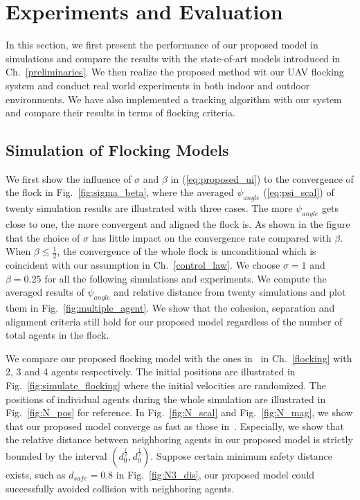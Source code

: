 \chapter{Experiments and Evaluation}\label{experiment}

In this section, we first present the performance of our proposed model in simulations and compare the results with the state-of-art models introduced in Ch.~\ref{preliminaries}. We then realize the proposed method wit our UAV flocking system and conduct real world experiments in both indoor and outdoor environments. We have also implemented a tracking algorithm with our system and compare their results in terms of flocking criteria.

\section{Simulation of Flocking Models}

We first show the influence of $\sigma$ and $\beta$ in (\ref{eq:proposed_ui}) to the convergence of the flock in Fig.~\ref{fig:sigma_beta}, where the averaged $\psi_{angle}$ (\ref{eq:psi_scal}) of twenty simulation results are illustrated with three cases. The more $\psi_{angle}$ gets close to one, the more convergent and aligned the flock is. As shown in the figure that the choice of $\sigma$ has little impact on the convergence rate compared with $\beta$. When $\beta\leq\frac{1}{2}$, the convergence of the whole flock is unconditional which is coincident with our assumption in Ch.~\ref{control_law}. We choose $\sigma=1$ and $\beta=0.25$ for all the following simulations and experiments. We compute the averaged results of $\psi_{angle}$ and relative distance from twenty simulations and plot them in Fig.~\ref{fig:multiple_agent}. We show that the cohesion, separation and alignment criteria still hold for our proposed model regardless of the number of total agents in the flock.

We compare our proposed flocking model with the ones in~\cite{Vicsek1995,CuckerSmale2007,CuckerDong2010} in Ch.~\ref{flocking} with 2, 3 and 4 agents respectively. The initial positions are illustrated in Fig.~\ref{fig:simulate_flocking} where the initial velocities are randomized. The positions of individual agents during the whole simulation are illustrated in Fig.~\ref{fig:N_pos} for reference. In Fig.~\ref{fig:N_scal} and Fig.~\ref{fig:N_mag}, we show that our proposed model converge as fast as those in~\cite{Vicsek1995,CuckerSmale2007,CuckerDong2010}. Especially, we show that the relative distance between neighboring agents in our proposed model is strictly bounded by the interval $(d_0^{\frac{1}{2}}, d_0^{\frac{1}{2}})$. Suppose certain minimum safety distance exists, such as $d_{safe}=0.8$ in Fig.~\ref{fig:N3_dis}, our proposed model could successfully avoided collision with neighboring agents.

